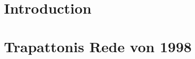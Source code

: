 \documentclass[12pt,        %
  english,ngerman,          %
  paper=a4,                 %
  captions=tablesignature,  %
  listof=numbered,          %
  bibliography=totoc,       %
  headings=small,           %
  headinclude=false,        %
  footinclude=false,        %
  parskip=half-,            %
  oneside,                  %
  DIV=12                    %
]{styles/coliartcl}
\begin{document}
 

\maketitle

\begin{minipage}{\textwidth}\bf
	\coliabstract
\end{minipage}





\section*{Introduction}

\lipsum


\section*{Trapattonis Rede von 1998}
\end{document}
